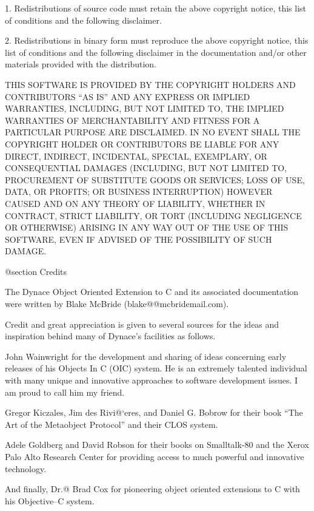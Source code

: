 1. Redistributions of source code must retain the above copyright
notice, this list of conditions and the following disclaimer.

2. Redistributions in binary form must reproduce the above copyright
notice, this list of conditions and the following disclaimer in the
documentation and/or other materials provided with the distribution.

THIS SOFTWARE IS PROVIDED BY THE COPYRIGHT HOLDERS AND CONTRIBUTORS
``AS IS'' AND ANY EXPRESS OR IMPLIED WARRANTIES, INCLUDING, BUT NOT
LIMITED TO, THE IMPLIED WARRANTIES OF MERCHANTABILITY AND FITNESS FOR
A PARTICULAR PURPOSE ARE DISCLAIMED. IN NO EVENT SHALL THE COPYRIGHT
HOLDER OR CONTRIBUTORS BE LIABLE FOR ANY DIRECT, INDIRECT, INCIDENTAL,
SPECIAL, EXEMPLARY, OR CONSEQUENTIAL DAMAGES (INCLUDING, BUT NOT
LIMITED TO, PROCUREMENT OF SUBSTITUTE GOODS OR SERVICES; LOSS OF USE,
DATA, OR PROFITS; OR BUSINESS INTERRUPTION) HOWEVER CAUSED AND ON ANY
THEORY OF LIABILITY, WHETHER IN CONTRACT, STRICT LIABILITY, OR TORT
(INCLUDING NEGLIGENCE OR OTHERWISE) ARISING IN ANY WAY OUT OF THE USE
OF THIS SOFTWARE, EVEN IF ADVISED OF THE POSSIBILITY OF SUCH DAMAGE.

@section Credits


The Dynace Object Oriented Extension to C
and its associated documentation were written by Blake McBride
(blake@@mcbridemail.com).

Credit and great appreciation is given to several sources for the
ideas and inspiration behind many of Dynace's facilities as follows.

John Wainwright for the development and sharing of ideas concerning
early releases of his Objects In C (OIC) system.  He is an extremely
talented individual with many unique and innovative approaches to
software development issues.  I am proud to call him my friend.

Gregor Kiczales, Jim des Rivi@`eres, and Daniel G. Bobrow for their
book ``The Art of the Metaobject Protocol'' and their CLOS
system.

Adele Goldberg and David Robson for their books on Smalltalk-80 and
the Xerox Palo Alto Research Center for providing access to much
powerful and innovative technology.

And finally, Dr.@ Brad Cox for pioneering object oriented extensions
to C with his Objective--C system.


